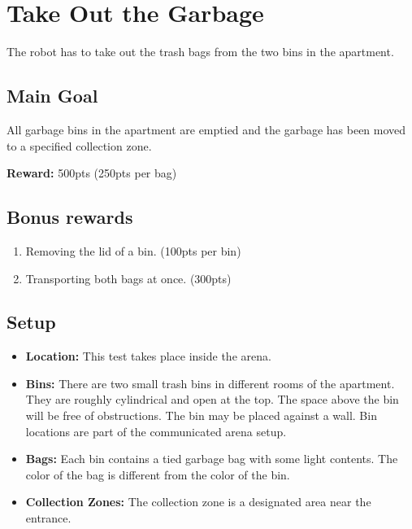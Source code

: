 \section{Take Out the Garbage}
The robot has to take out the trash bags from the two bins in the apartment.


\subsection{Main Goal}
All garbage bins in the apartment are emptied and the garbage has been moved to a specified collection zone.

\noindent\textbf{Reward:} 500pts (250pts per bag)

\subsection{Bonus rewards}
\begin{enumerate}[nosep]
	\item Removing the lid of a bin. (100pts per bin) 
	\item Transporting both bags at once. (300pts)
\end{enumerate}

\subsection{Setup}
\begin{itemize}[nosep]
	\item \textbf{Location:} This test takes place inside the arena.
	\item \textbf{Bins:} There are two small trash bins in different rooms of the apartment. They are roughly cylindrical and open at the top. The space above the bin will be free of obstructions. The bin may be placed against a wall. Bin locations are part of the communicated arena setup.
	\item \textbf{Bags:} Each bin contains a tied garbage bag with some light contents. The color of the bag is different from the color of the bin.
	\item \textbf{Collection Zones:} The collection zone is a designated area near the entrance. 
\end{itemize}


